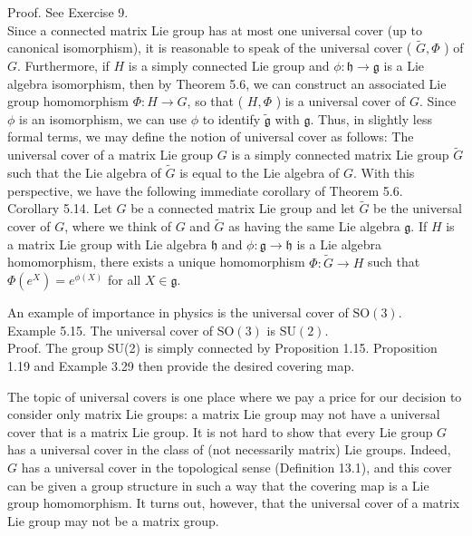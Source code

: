 \documentclass[10pt, letterpaper]{article}
\begin{document}
Proof. See Exercise 9.\\
Since a connected matrix Lie group has at most one universal cover (up to canonical isomorphism), it is reasonable to speak of the universal cover ( $\tilde{G}, \Phi$ ) of $G$. Furthermore, if $H$ is a simply connected Lie group and $\phi: \mathfrak{h} \rightarrow \mathfrak{g}$ is a Lie algebra isomorphism, then by Theorem 5.6, we can construct an associated Lie group homomorphism $\Phi: H \rightarrow G$, so that ( $H, \Phi$ ) is a universal cover of $G$. Since $\phi$ is an isomorphism, we can use $\phi$ to identify $\tilde{\mathfrak{g}}$ with $\mathfrak{g}$. Thus, in slightly less formal terms, we may define the notion of universal cover as follows: The universal cover of a matrix Lie group $G$ is a simply connected matrix Lie group $\tilde{G}$ such that the Lie algebra of $\tilde{G}$ is equal to the Lie algebra of $G$. With this perspective, we have the following immediate corollary of Theorem 5.6.\\
Corollary 5.14. Let $G$ be a connected matrix Lie group and let $\tilde{G}$ be the universal cover of $G$, where we think of $G$ and $\tilde{G}$ as having the same Lie algebra $\mathfrak{g}$. If $H$ is a matrix Lie group with Lie algebra $\mathfrak{h}$ and $\phi: \mathfrak{g} \rightarrow \mathfrak{h}$ is a Lie algebra homomorphism, there exists a unique homomorphism $\Phi: \tilde{G} \rightarrow H$ such that $\Phi\left(e^{X}\right)=e^{\phi(X)}$ for all $X \in \mathfrak{g}$.

An example of importance in physics is the universal cover of $\mathrm{SO}(3)$.\\
Example 5.15. The universal cover of $\mathrm{SO}(3)$ is $\mathrm{SU}(2)$.\\
Proof. The group SU(2) is simply connected by Proposition 1.15. Proposition 1.19 and Example 3.29 then provide the desired covering map.

The topic of universal covers is one place where we pay a price for our decision to consider only matrix Lie groups: a matrix Lie group may not have a universal cover that is a matrix Lie group. It is not hard to show that every Lie group $G$\\
has a universal cover in the class of (not necessarily matrix) Lie groups. Indeed, $G$ has a universal cover in the topological sense (Definition 13.1), and this cover can be given a group structure in such a way that the covering map is a Lie group homomorphism. It turns out, however, that the universal cover of a matrix Lie group may not be a matrix group.
\end{document}
